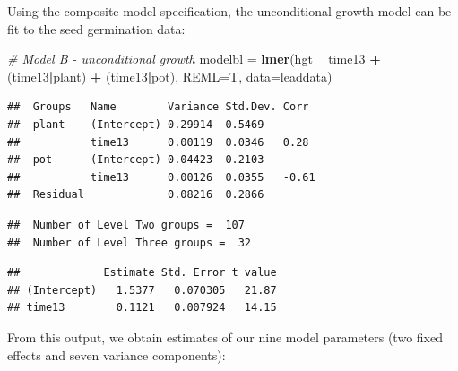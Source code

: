 \documentclass[
]{krantz}
\newenvironment{Shaded}{\begin{snugshade}}{\end{snugshade}}
\newcommand{\CommentTok}[1]{\textcolor[rgb]{0.37,0.37,0.37}{\textit{#1}}}
\newcommand{\DataTypeTok}[1]{\textcolor[rgb]{0.27,0.27,0.27}{#1}}
\newcommand{\KeywordTok}[1]{\textcolor[rgb]{0.27,0.27,0.27}{\textbf{#1}}}
\newcommand{\NormalTok}[1]{#1}
\newcommand{\OperatorTok}[1]{\textcolor[rgb]{0.43,0.43,0.43}{\textbf{#1}}}
\newcommand{\StringTok}[1]{\textcolor[rgb]{0.5,0.5,0.5}{#1}}
\begin{document}
Using the composite model specification, the unconditional growth model can be fit to the seed germination data:

\begin{Shaded}
\begin{Highlighting}[]
\CommentTok{# Model B - unconditional growth}
\NormalTok{modelbl =}\StringTok{ }\KeywordTok{lmer}\NormalTok{(hgt }\OperatorTok{~}\StringTok{ }\NormalTok{time13 }\OperatorTok{+}\StringTok{ }\NormalTok{(time13}\OperatorTok{|}\NormalTok{plant) }\OperatorTok{+}\StringTok{ }\NormalTok{(time13}\OperatorTok{|}\NormalTok{pot),}
               \DataTypeTok{REML=}\NormalTok{T, }\DataTypeTok{data=}\NormalTok{leaddata)}
\end{Highlighting}
\end{Shaded}

\begin{verbatim}
##  Groups   Name        Variance Std.Dev. Corr 
##  plant    (Intercept) 0.29914  0.5469        
##           time13      0.00119  0.0346   0.28 
##  pot      (Intercept) 0.04423  0.2103        
##           time13      0.00126  0.0355   -0.61
##  Residual             0.08216  0.2866
\end{verbatim}

\begin{verbatim}
##  Number of Level Two groups =  107 
##  Number of Level Three groups =  32
\end{verbatim}

\begin{verbatim}
##             Estimate Std. Error t value
## (Intercept)   1.5377   0.070305   21.87
## time13        0.1121   0.007924   14.15
\end{verbatim}

From this output, we obtain estimates of our nine model parameters (two fixed effects and seven variance components):
\end{document}
